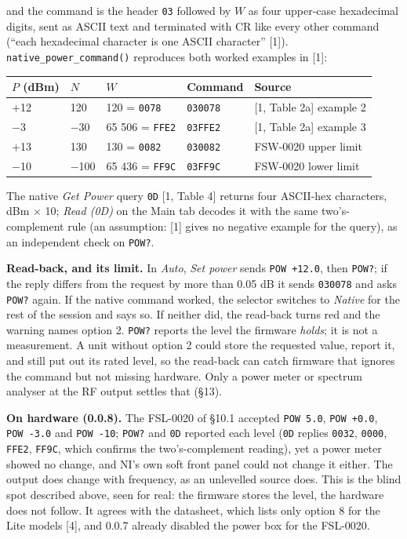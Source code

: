 \documentclass[
\directlua{luaotfload.add_fallback("qsfallback", {"DejaVu Sans:mode=harf;", "DejaVu Sans Mono:mode=harf;", "DejaVu Math TeX Gyre:mode=harf;"})}
  10pt,
  letterpaper,
]{article}
\begin{document}
and the command is the header \texttt{03} followed by \(W\) as four
upper-case hexadecimal digits, sent as ASCII text and terminated with CR
like every other command (``each hexadecimal character is one ASCII
character'' {[}1{]}). \texttt{native\_power\_command()} reproduces both
worked examples in {[}1{]}:

\begin{longtable}[]{@{}lllll@{}}
\toprule\noalign{}
\(P\) (dBm) & \(N\) & \(W\) & Command & Source \\
\midrule\noalign{}
\endhead
\bottomrule\noalign{}
\endlastfoot
+12 & 120 & 120 = \texttt{0078} & \texttt{030078} & {[}1, Table 2a{]}
example 2 \\
−3 & −30 & 65 506 = \texttt{FFE2} & \texttt{03FFE2} & {[}1, Table 2a{]}
example 3 \\
+13 & 130 & 130 = \texttt{0082} & \texttt{030082} & FSW-0020 upper
limit \\
−10 & −100 & 65 436 = \texttt{FF9C} & \texttt{03FF9C} & FSW-0020 lower
limit \\
\end{longtable}

The native \emph{Get Power} query \texttt{0D} {[}1, Table 4{]} returns
four ASCII-hex characters, dBm × 10; \emph{Read (0D)} on the Main tab
decodes it with the same two's-complement rule (an assumption: {[}1{]}
gives no negative example for the query), as an independent check on
\texttt{POW?}.

\textbf{Read-back, and its limit.} In \emph{Auto}, \emph{Set power}
sends \texttt{POW\ +12.0}, then \texttt{POW?}; if the reply differs from
the request by more than 0.05 dB it sends \texttt{030078} and asks
\texttt{POW?} again. If the native command worked, the selector switches
to \emph{Native} for the rest of the session and says so. If neither
did, the read-back turns red and the warning names option 2.
\texttt{POW?} reports the level the firmware \emph{holds}; it is not a
measurement. A unit without option 2 could store the requested value,
report it, and still put out its rated level, so the read-back can catch
firmware that ignores the command but not missing hardware. Only a power
meter or spectrum analyser at the RF output settles that (§13).

\textbf{On hardware (0.0.8).} The FSL-0020 of §10.1 accepted
\texttt{POW\ 5.0}, \texttt{POW\ +0.0}, \texttt{POW\ -3.0} and
\texttt{POW\ -10}; \texttt{POW?} and \texttt{0D} reported each level
(\texttt{0D} replies \texttt{0032}, \texttt{0000}, \texttt{FFE2},
\texttt{FF9C}, which confirms the two's-complement reading), yet a power
meter showed no change, and NI's own soft front panel could not change
it either. The output does change with frequency, as an unlevelled
source does. This is the blind spot described above, seen for real: the
firmware stores the level, the hardware does not follow. It agrees with
the datasheet, which lists only option 8 for the Lite models {[}4{]},
and 0.0.7 already disabled the power box for the FSL-0020.
\end{document}
